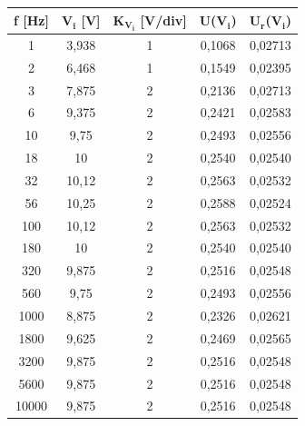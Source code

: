 \begin{table}[!ht]
    \centering
    \begin{tabular}{|c|c|c|c|c|}
    \hline

        \textbf{f [Hz]} & \textbf{$\bm{V_{i}}$ [V]} & \textbf{$\bm{K_{V_i}}$ [V/div]} & \textbf{U($\bm{V_{i}}$)} & \textbf{$\bm{U_{r}}$($\bm{V_{i}}$)} \\ \hline

        1 & 3,938 & 1 & 0,1068 & 0,02713 \\ \hline
        2 & 6,468 & 1 & 0,1549 & 0,02395 \\ \hline
        3 & 7,875 & 2 & 0,2136 & 0,02713 \\ \hline
        6 & 9,375 & 2 & 0,2421 & 0,02583 \\ \hline
        10 & 9,75 & 2 & 0,2493 & 0,02556 \\ \hline
        18 & 10 & 2 & 0,2540 & 0,02540 \\ \hline
        32 & 10,12 & 2 & 0,2563 & 0,02532 \\ \hline
        56 & 10,25 & 2 & 0,2588 & 0,02524 \\ \hline
        100 & 10,12 & 2 & 0,2563 & 0,02532 \\ \hline
        180 & 10 & 2 & 0,2540 & 0,02540 \\ \hline
        320 & 9,875 & 2 & 0,2516 & 0,02548 \\ \hline
        560 & 9,75 & 2 & 0,2493 & 0,02556 \\ \hline
        1000 & 8,875 & 2 & 0,2326 & 0,02621 \\ \hline
        1800 & 9,625 & 2 & 0,2469 & 0,02565 \\ \hline
        3200 & 9,875 & 2 & 0,2516 & 0,02548 \\ \hline
        5600 & 9,875 & 2 & 0,2516 & 0,02548 \\ \hline
        10000 & 9,875 & 2 & 0,2516 & 0,02548 \\ \hline
    \end{tabular}
\end{table}


